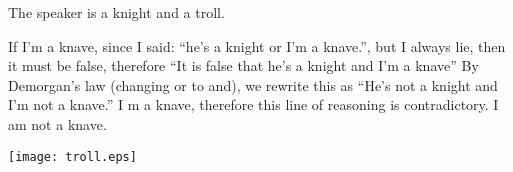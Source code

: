 \item The speaker is a knight and a troll.

If I'm a knave, since I said: ``he's a knight or I'm a knave.'', but I always lie, then it must be false, therefore ``It is false that he's a knight and I'm a knave'' By Demorgan's law (changing or to and), we rewrite this as ``He's not a knight and I'm not a knave.'' I m a knave, therefore this line of reasoning is contradictory. I am not a knave.

\texttt{[image: troll.eps]}

